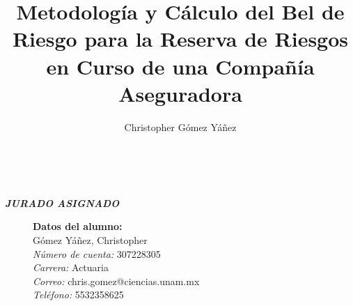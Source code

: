 \documentclass[11pt,twoside,openright,spanish]{report}
\numberwithin{equation}{chapter}
\numberwithin{figure}{chapter}
\numberwithin{table}{chapter}
\renewcommand{\baselinestretch}{1.5}
\newenvironment{changemargin}[3]{
	\begin{list}{}{
			\setlength{\topsep}{#3}
			\setlength{\leftmargin}{#1}
			\setlength{\rightmargin}{#2}
			\setlength{\listparindent}{\parindent}
			\setlength{\itemindent}{\parindent}
			\setlength{\parsep}{\parskip}
		}
		\item[]}{\end{list}}
\begin{document}
	
	\renewcommand{\baselinestretch}{1}
	
	\graphicspath{{./Imagenes/}}
	
	\title{Metodología y Cálculo del Bel de Riesgo para la Reserva de Riesgos en Curso de una Compañía Aseguradora}
	\author{Christopher Gómez Yáñez}
	\maketitle
	
	\newpage
	$\ $
	\thispagestyle{empty} %
	
	\begin{changemargin}{1cm}{0cm}{1cm}
		
		\vspace{30cm} 
		\begin{center}
			\textit{\textbf{\Large JURADO ASIGNADO}}
		\end{center}
		\vspace{1cm}
		 
		\begin{description}
			\item[]\textbf{Datos del alumno:}\\
			Gómez Yáñez, Christopher\\
			\textit{Número de cuenta:} 307228305\\
			\textit{Carrera:} Actuaria\\
			\textit{Correo:} chris.gomez@ciencias.unam.mx\\
			\textit{Teléfono:} 5532358625
			

\end{description}
\end{changemargin}
\end{document}

